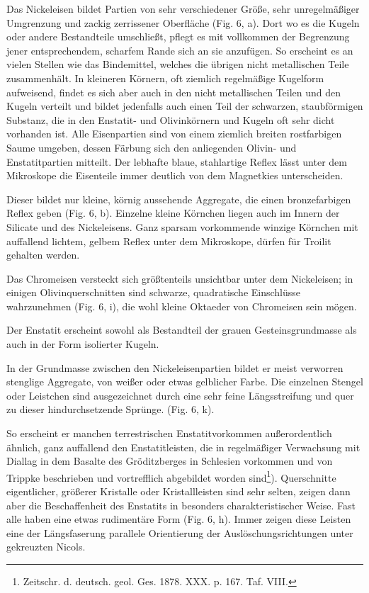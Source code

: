 \documentclass[a4paper, 11pt, oneside]{article}
\begin{document}
Das Nickeleisen bildet Partien von sehr verschiedener Größe, sehr unregelmäßiger Umgrenzung und zackig zerrissener Oberfläche (Fig. 6, a). Dort wo es die Kugeln oder andere Bestandteile umschließt, pflegt es mit vollkommen der Begrenzung jener entsprechendem, scharfem Rande sich an sie anzufügen. So erscheint es an vielen Stellen wie das Bindemittel, welches die übrigen nicht metallischen Teile zusammenhält. In kleineren Körnern, oft ziemlich regelmäßige Kugelform aufweisend, findet es sich aber auch in den nicht metallischen Teilen und den Kugeln verteilt und bildet jedenfalls auch einen Teil der schwarzen, staubförmigen Substanz, die in den Enstatit- und Olivinkörnern und Kugeln oft sehr dicht vorhanden ist. Alle Eisenpartien sind von einem ziemlich breiten rostfarbigen Saume umgeben, dessen Färbung sich den anliegenden Olivin- und Enstatitpartien mitteilt. Der lebhafte blaue, stahlartige Reflex lässt unter dem Mikroskope die Eisenteile immer deutlich von dem Magnetkies unterscheiden.

Dieser bildet nur kleine, körnig aussehende Aggregate, die einen bronzefarbigen Reflex geben (Fig. 6, b). Einzelne kleine Körnchen liegen auch im Innern der Silicate und des Nickeleisens. Ganz sparsam vorkommende winzige Körnchen mit auffallend lichtem, gelbem Reflex unter dem Mikroskope, dürfen für Troilit gehalten werden.

Das Chromeisen versteckt sich größtenteils unsichtbar unter dem Nickeleisen; in einigen Olivinquerschnitten sind schwarze, quadratische Einschlüsse wahrzunehmen (Fig. 6, i), die wohl kleine Oktaeder von Chromeisen sein mögen.

Der Enstatit erscheint sowohl als Bestandteil der grauen Gesteinsgrundmasse als auch in der Form isolierter Kugeln.

In der Grundmasse zwischen den Nickeleisenpartien bildet er meist verworren stenglige Aggregate, von weißer oder etwas gelblicher Farbe. Die einzelnen Stengel oder Leistchen sind ausgezeichnet durch eine sehr feine Längsstreifung und quer zu dieser hindurchsetzende Sprünge. (Fig. 6, k).

So erscheint er manchen terrestrischen Enstatitvorkommen außerordentlich ähnlich, ganz auffallend den Enstatitleisten, die in regelmäßiger Verwachsung mit Diallag in dem Basalte des Gröditzberges in Schlesien vorkommen und von Trippke beschrieben und vortrefflich abgebildet worden sind\footnote{Zeitschr. d. deutsch. geol. Ges. 1878. XXX. p. 167. Taf. VIII.}). Querschnitte eigentlicher, größerer Kristalle oder Kristallleisten sind sehr selten, zeigen dann aber die Beschaffenheit des Enstatits in besonders charakteristischer Weise. Fast alle haben eine etwas rudimentäre Form (Fig. 6, h). Immer zeigen diese Leisten eine der Längsfaserung parallele Orientierung der Auslöschungsrichtungen unter gekreuzten Nicols.
\end{document}

